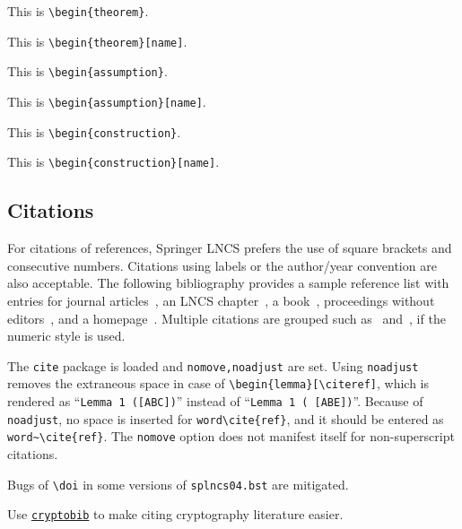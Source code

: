 \begin{theorem}
This is \texttt{\textbackslash begin\{theorem\}}.
\end{theorem}

\begin{theorem}[name]\label{thm:theorem10}
This is \texttt{\textbackslash begin\{theorem\}[name]}.
\end{theorem}

\begin{assumption}
This is \texttt{\textbackslash begin\{assumption\}}.
\end{assumption}

\begin{assumption}[name]
This is \texttt{\textbackslash begin\{assumption\}[name]}.
\end{assumption}

\begin{construction}
This is \texttt{\textbackslash begin\{construction\}}.
\end{construction}

\begin{construction}[name]
This is \texttt{\textbackslash begin\{construction\}[name]}.
\end{construction}

\subsection{Citations}

For citations of references, Springer LNCS prefers the use of square brackets
and consecutive numbers. Citations using labels or the author/year
convention are also acceptable. The following bibliography provides
a sample reference list with entries for journal
articles~\cite{ref_article1}, an LNCS chapter~\cite{ref_lncs1}, a
book~\cite{ref_book1}, proceedings without editors~\cite{ref_proc1},
and a homepage~\cite{ref_url1}. Multiple citations are grouped
such as~\cite{ref_article1,ref_lncs1,ref_book1}
and~\cite{ref_article1,ref_book1,ref_proc1,ref_url1},
if the numeric style is used.

The \texttt{cite} package is loaded and \texttt{nomove,noadjust} are set.
Using \texttt{noadjust} removes the extraneous space
in case of \texttt{\textbackslash begin\{lemma\}[\textbackslash cite{ref}]},
which is rendered as ``\texttt{Lemma 1 ([ABC])}''
instead of ``\texttt{Lemma 1 ( [ABE])}''.
Because of \texttt{noadjust},
no space is inserted for \texttt{word\textbackslash cite\{ref\}},
and it should be entered as
\texttt{word\textasciitilde\textbackslash cite\{ref\}}.
The \texttt{nomove} option does not manifest itself
for non-superscript citations.

Bugs of \texttt{\textbackslash doi}
in some versions of \texttt{splncs04.bst}
are mitigated.

Use \href{https://github.com/cryptobib/export}{\texttt{cryptobib}} to make citing cryptography literature easier.
